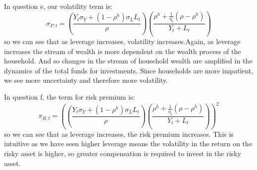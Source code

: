 \documentclass{article}
\begin{document}
In question e, our volatility term is:
\[
    \sigma_{P, t} = \left(\frac{Y_t \sigma_Y + (1 - \rho^h) \sigma_L L_t}{\rho}\right) \left(\frac{\rho^h + \frac{1}{\eta_t}(\rho-\rho^h)}{Y_{t} + L_t} \right)    
\]
so we can see that as leverage increases, volatility increases.Again, as leverage increases the stream of wealth is more dependent on the wealth process of the household. And so changes in the stream of household wealth are amplified in the dynamics of the total funds for investments. Since households are more impatient, we see more uncertainty and therefore more volatility. 

In question f, the term for risk premium is:
\[
    \pi_{R, t} = \left(\left(\frac{Y_t \sigma_Y + (1 - \rho^h) \sigma_L L_t}{\rho}\right) \left(\frac{\rho^h + \frac{1}{\eta_t}(\rho-\rho^h)}{Y_{t} + L_t} \right)\right)^2
\]
so we can see that as leverage increases, the risk premium increases. This is intuitive as we have seen higher leverage means the volatility in the return on the risky asset is higher, so greater compensation is required to invest in the risky asset.
\end{document}
